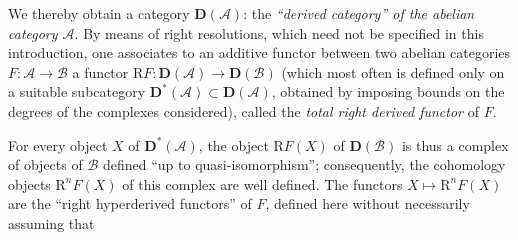 We thereby obtain a category $\mathbf D(\mathcal A)$: the
\emph{``derived category'' of the abelian category $\mathcal A$}. By means of
right resolutions, which need not be specified in this introduction, one
associates to an additive functor between two abelian categories
$F:\mathcal A\to\mathcal B$ a functor
$\mathrm RF:\mathbf D(\mathcal A)\to\mathbf D(\mathcal B)$ (which most often
is defined only on a suitable subcategory
$\mathbf D^*(\mathcal A)\subset\mathbf D(\mathcal A)$, obtained by imposing
bounds on the degrees of the complexes considered), called the
\emph{total right derived functor} of $F$.

For every object $X$ of $\mathbf D^*(\mathcal A)$, the object $\mathrm RF(X)$
of $\mathbf D(\mathcal B)$ is thus a complex of objects of $\mathcal B$
defined ``up to quasi-isomorphism''; consequently, the cohomology objects
$\mathrm R^nF(X)$ of this complex are well defined. The functors
$X\longmapsto\mathrm R^nF(X)$ are the ``right hyperderived functors'' of $F$,
defined here without necessarily assuming that
